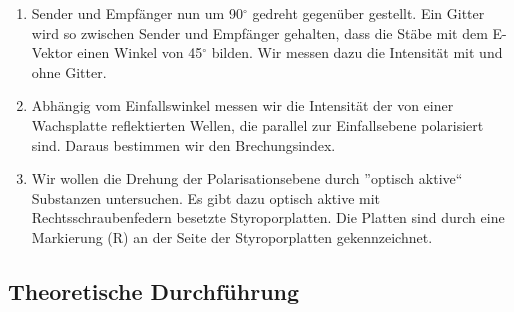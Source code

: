 \documentclass[12pt]{scrartcl}
\begin{document}
\begin{enumerate}
\item Sender und Empfänger nun um 90$^{\circ}$ gedreht gegenüber gestellt. Ein Gitter wird so zwischen Sender und Empfänger gehalten, dass die Stäbe mit dem E-Vektor einen Winkel von 45$^{\circ}$ bilden. Wir messen dazu die Intensität mit und ohne Gitter.

\item Abhängig vom Einfallswinkel messen wir die Intensität der von einer Wachsplatte reflektierten Wellen, die parallel zur Einfallsebene polarisiert sind. Daraus bestimmen wir den Brechungsindex.

\item Wir wollen die Drehung der Polarisationsebene durch ”optisch aktive“ Substanzen untersuchen. Es gibt dazu optisch aktive mit Rechtsschraubenfedern besetzte Styroporplatten. Die Platten sind durch eine Markierung (R) an der Seite der Styroporplatten gekennzeichnet.
\end{enumerate}

\subsection{Theoretische Durchführung}
\end{document}
